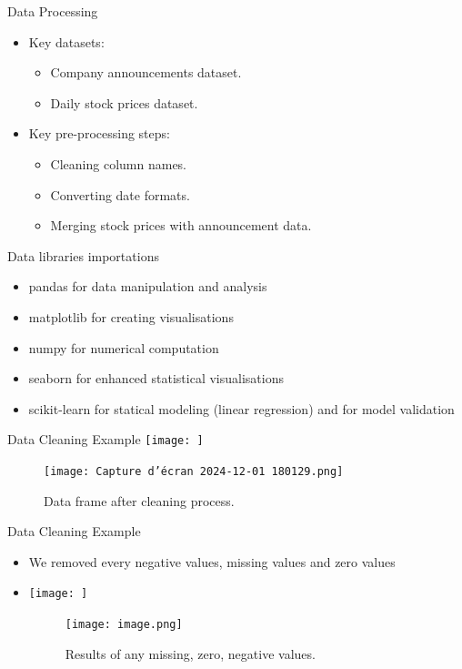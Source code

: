 \documentclass{beamer}
\begin{document}
\begin{frame}{Data Processing}
  \begin{itemize}
    \item Key datasets:
      \begin{itemize}
        \item Company announcements dataset.
        \item Daily stock prices dataset.
      \end{itemize}
    \item Key pre-processing steps:
      \begin{itemize}
        \item Cleaning column names.
        \item Converting date formats.
        \item Merging stock prices with announcement data.
      \end{itemize}
  \end{itemize}
\end{frame}

\begin{frame}{Data libraries importations}
\begin{itemize}
    \item pandas for data manipulation and analysis
    \item matplotlib for creating visualisations
    \item numpy for numerical computation
    \item seaborn for enhanced statistical visualisations
    \item scikit-learn for statical modeling (linear regression) and for model validation 
\end{itemize}
    
\end{frame}

\begin{frame}{Data Cleaning Example}
  \centering
  \texttt{[image: ]} %
\begin{figure}
      \centering
      \texttt{[image: Capture d'écran 2024-12-01 180129.png]}
      \caption{Data frame after cleaning process.}
      \label{fig:enter-label}
  \end{figure}
\end{frame}

\begin{frame}{Data Cleaning Example}
\begin{itemize}
    \item  We removed every negative values, missing values and zero values
    \item 
    \centering
  \texttt{[image: ]} %
\begin{figure}
          \centering
          \texttt{[image: image.png]}
          \caption{Results of any missing, zero, negative values.}
          \label{fig:enter-label}
      \end{figure}
    \end{itemize}
\end{frame}
\end{document}
